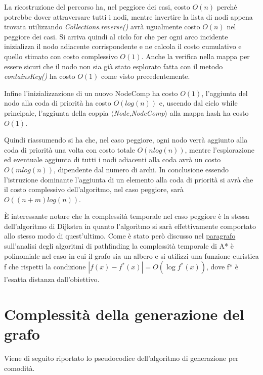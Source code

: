 \documentclass[12pt,a4paper]{report}
\begin{document}
La ricostruzione del percorso ha, nel peggiore dei casi, costo $O(n)$ perché potrebbe dover attraversare tutti i nodi, mentre invertire la lista di nodi appena trovata utilizzando \textit{Collections.reverse()} avrà ugualmente costo $O(n)$ nel peggiore dei casi.
Si arriva quindi al ciclo for che per ogni arco incidente inizializza il nodo adiacente corrispondente e ne calcola il costo cumulativo e quello stimato con costo complessivo $O(1)$. Anche la verifica nella mappa per essere sicuri che il nodo non sia già stato esplorato fatta con il metodo \textit{containsKey()} ha costo $O(1)$ come visto precedentemente.

Infine l'inizializzazione di un nuovo NodeComp ha costo $O(1)$, l'aggiunta del nodo alla coda di priorità ha costo $O(log(n))$ e, uscendo dal ciclo while principale, l'aggiunta della coppia $\langle$\textit{Node,NodeComp}$\rangle$ alla mappa hash ha costo $O(1)$.

\medskip

Quindi riassumendo si ha che, nel caso peggiore, ogni nodo verrà aggiunto alla coda di priorità una volta con costo totale $O(nlog(n))$, mentre l'esplorazione ed eventuale aggiunta di tutti i nodi adiacenti alla coda avrà un costo $O(mlog(n))$, dipendente dal numero di archi. 
In conclusione essendo l'istruzione dominante l'aggiunta di un elemento alla coda di priorità si avrà che il costo complessivo dell'algoritmo, nel caso peggiore, sarà $O((n+m)log(n))$.

\medskip

È interessante notare che la complessità temporale nel caso peggiore è la stessa dell'algoritmo di Dijkstra\cite{wikipediaDijkstrasAlgorithm} in quanto l'algoritmo si sarà effettivamente comportato allo stesso modo di quest'ultimo. Come è stato però discusso nel \hyperref[se:algo-path-anal]{paragrafo} sull'analisi degli algoritmi di pathfinding la complessità temporale di A* è polinomiale nel caso in cui il grafo sia un albero e si utilizzi una funzione euristica f che rispetti la condizione \textbf{\textit{$|f(x)-f^{*}(x)|=O(\log f^{*}(x))$}}, dove f* è l'esatta distanza dall'obiettivo.

\newpage

\section{Complessità della generazione del grafo}\label{se:comp-gen-graf}
Viene di seguito riportato lo pseudocodice dell'algoritmo di generazione per comodità.
\end{document}
